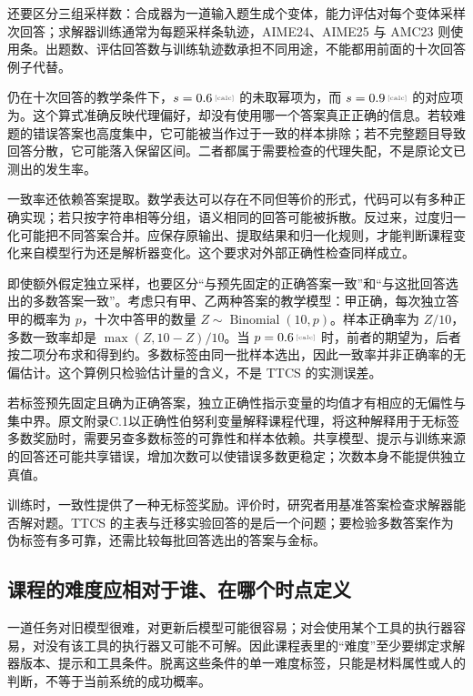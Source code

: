 还要区分三组采样数：合成器为一道输入题生成个变体，能力评估对每个变体采样次回答；求解器训练通常为每题采样条轨迹，AIME24、AIME25 与 AMC23 则使用条\cite{ttcs-2601}。出题数、评估回答数与训练轨迹数承担不同用途，不能都用前面的十次回答例子代替。

仍在十次回答的教学条件下，$s=\calcnum{0.6}$ 的未取幂项为，而 $s=\calcnum{0.9}$ 的对应项为。这个算式准确反映代理偏好，却没有使用哪一个答案真正正确的信息。若较难题的错误答案也高度集中，它可能被当作过于一致的样本排除；若不完整题目导致回答分散，它可能落入保留区间。二者都属于需要检查的代理失配，不是原论文已测出的发生率。

一致率还依赖答案提取。数学表达可以存在不同但等价的形式，代码可以有多种正确实现；若只按字符串相等分组，语义相同的回答可能被拆散。反过来，过度归一化可能把不同答案合并。应保存原输出、提取结果和归一化规则，才能判断课程变化来自模型行为还是解析器变化。这个要求对外部正确性检查同样成立。

即使额外假定独立采样，也要区分“与预先固定的正确答案一致”和“与这批回答选出的多数答案一致”。考虑只有甲、乙两种答案的教学模型：甲正确，每次独立答甲的概率为 $p$，十次中答甲的数量 $Z\sim\operatorname{Binomial}(10,p)$。样本正确率为 $Z/10$，多数一致率却是 $\max(Z,10-Z)/10$。当 $p=\calcnum{0.6}$ 时，前者的期望为，后者按二项分布求和得到约。多数标签由同一批样本选出，因此一致率并非正确率的无偏估计。这个算例只检验估计量的含义，不是 TTCS 的实测误差。

若标签预先固定且确为正确答案，独立正确性指示变量的均值才有相应的无偏性与集中界。原文附录C.1以正确性伯努利变量解释课程代理\cite{ttcs-2601}，将这种解释用于无标签多数奖励时，需要另查多数标签的可靠性和样本依赖。共享模型、提示与训练来源的回答还可能共享错误，增加次数可以使错误多数更稳定；次数本身不能提供独立真值。

训练时，一致性提供了一种无标签奖励。评价时，研究者用基准答案检查求解器能否解对题。TTCS 的主表与迁移实验回答的是后一个问题；要检验多数答案作为伪标签有多可靠，还需比较每批回答选出的答案与金标。

\subsection{课程的难度应相对于谁、在哪个时点定义}
\label{sec:ch11-difficulty}

一道任务对旧模型很难，对更新后模型可能很容易；对会使用某个工具的执行器容易，对没有该工具的执行器又可能不可解。因此课程表里的“难度”至少要绑定求解器版本、提示和工具条件。脱离这些条件的单一难度标签，只能是材料属性或人的判断，不等于当前系统的成功概率。

